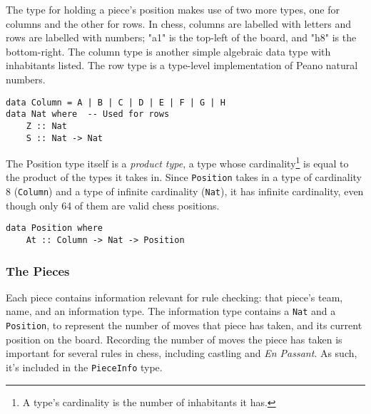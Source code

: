 \documentclass[12pt, a4paper]{scrartcl}
\begin{document}
The type for holding a piece's position makes use of two more types, one for columns and the other for rows. In chess, columns are labelled with letters and rows are labelled with numbers; "a1" is the top-left of the board, and "h8" is the bottom-right. The column type is another simple algebraic data type with inhabitants listed. The row type is a type-level implementation of Peano natural numbers.


\begin{lstlisting}
data Column = A | B | C | D | E | F | G | H
data Nat where  -- Used for rows
    Z :: Nat
    S :: Nat -> Nat
\end{lstlisting}

The Position type itself is a \emph{product type}, a type whose cardinality\footnote{A type's cardinality is the number of inhabitants it has.} is equal to the product of the types it takes in. Since \lstinline{Position} takes in a type of cardinality 8 (\lstinline{Column}) and a type of infinite cardinality (\lstinline{Nat}), it has infinite cardinality, even though only 64 of them are valid chess positions.


\begin{lstlisting}
data Position where
    At :: Column -> Nat -> Position
\end{lstlisting}

\subsubsection{The Pieces}

Each piece contains information relevant for rule checking: that piece's team, name, and an information type. The information type contains a \lstinline{Nat} and a \lstinline{Position}, to represent the number of moves that piece has taken, and its current position on the board. Recording the number of moves the piece has taken is important for several rules in chess, including castling and \textit{En Passant}. As such, it's included in the \lstinline{PieceInfo} type.
\end{document}
